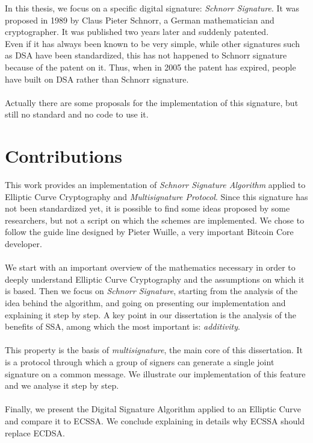In this thesis, we focus on a specific digital signature: \textit{Schnorr Signature}. It was proposed in 1989 by Claus Pieter Schnorr, a German mathematician and cryptographer. It was published two years later and suddenly patented.\\
Even if it has always been known to be very simple, while other signatures such as DSA have been standardized, this has not happened to Schnorr signature because of the patent on it. Thus, when in 2005 the patent has expired, people have built on DSA rather than Schnorr signature.\\
\\
Actually there are some proposals for the implementation of this signature, but still no standard and no code to use it.
\section{Contributions}
This work provides an implementation of \textit{Schnorr Signature Algorithm} applied to Elliptic Curve Cryptography and \textit{Multisignature Protocol}. Since this signature has not been standardized yet, it is possible to find some ideas proposed by some researchers, but not a script on which the schemes are implemented. We chose to follow the guide line designed by Pieter Wuille, a very important Bitcoin Core developer. \\
\\
We start with an important overview of the mathematics necessary in order to deeply understand Elliptic Curve Cryptography and the assumptions on which it is based. Then we focus on \textit{Schnorr Signature}, starting from the analysis of the idea behind the algorithm, and going on presenting our implementation and explaining it step by step. A key point in our dissertation is the analysis of the benefits of SSA, among which the most important is: \textit{additivity}.\\ 
\\
This property is the basis of \textit{multisignature}, the main core of this dissertation. It is a protocol through which a group of signers can generate a single joint signature on a common message. We illustrate our implementation of this feature and we analyse it step by step.\\
\\
Finally, we present the Digital Signature Algorithm applied to an Elliptic Curve and compare it to ECSSA. We conclude explaining in details why ECSSA should replace ECDSA.

